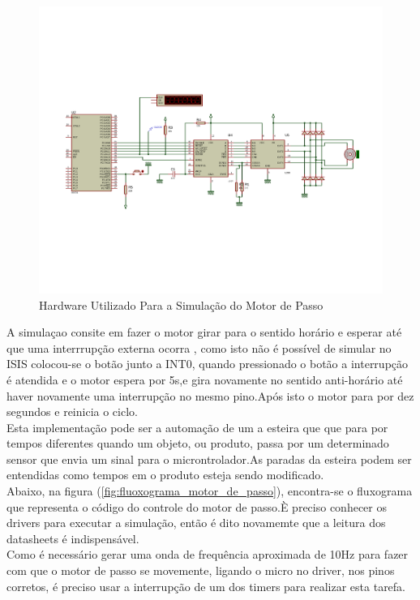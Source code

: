 \documentclass{Fabiano_file}
\begin{document}
{\begin{figure}[h!]
\centering
\includegraphics[width=1\textwidth]{motor_passo_80c51.pdf}
\caption{Hardware Utilizado Para a Simulação do Motor de Passo}
\label{fig:motor_passo_80c51}
\end{figure}

A simulaçao consite em fazer o motor girar para o sentido horário e esperar até que uma interrrupção externa ocorra , como isto não é possível de simular no ISIS
colocou-se o botão junto a INT0, quando pressionado o botão a interrupção é atendida e o motor espera por 5s,e gira novamente no sentido anti-horário
até haver novamente uma interrupção no mesmo pino.Após isto o motor para por dez segundos e reinicia o ciclo.\\

Esta implementação pode ser a automação de um a esteira que que para por tempos diferentes quando um objeto, ou produto, passa por um determinado sensor que
envia um sinal para o microntrolador.As paradas da esteira podem ser entendidas como tempos em o produto esteja sendo modificado.\\

Abaixo, na figura (\ref{fig:fluoxograma_motor_de_passo}), encontra-se o fluxograma que representa o código do controle do motor de passo.È preciso conhecer 
os drivers para executar a simulação, então é dito novamemte que a leitura dos datasheets é indispensável.\\

Como é necessário gerar uma onda de frequência aproximada de 10Hz para fazer com que o motor de passo se movemente, ligando o micro no driver, nos pinos 
corretos, é preciso usar a interrupção de um dos timers para realizar esta tarefa.\\

}
\end{document}
